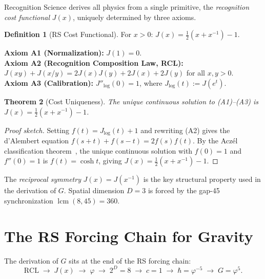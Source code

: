 \documentclass[12pt,a4paper]{article}
\newtheorem{theorem}{Theorem}[section]
\theoremstyle{definition}
\newtheorem{definition}[theorem]{Definition}
\theoremstyle{remark}
\begin{document}
Recognition Science derives all physics from a single primitive,
the \emph{recognition cost functional} $J(x)$, uniquely determined
by three axioms.

\begin{definition}[RS Cost Functional]
For $x > 0$: $J(x) = \tfrac{1}{2}(x + x^{-1}) - 1$.
\end{definition}

\noindent\textbf{Axiom A1 (Normalization):} $J(1) = 0$.\\
\textbf{Axiom A2 (Recognition Composition Law, RCL):}
$J(xy) + J(x/y) = 2J(x)J(y) + 2J(x) + 2J(y)$ for all $x, y > 0$.\\
\textbf{Axiom A3 (Calibration):} $J''_{\log}(0) = 1$, where
$J_{\log}(t) := J(e^t)$.

\begin{theorem}[Cost Uniqueness]
\label{thm:unique}
The unique continuous solution to \textup{(A1)--(A3)} is
$J(x) = \tfrac{1}{2}(x + x^{-1}) - 1$.
\end{theorem}

\begin{proof}[Proof sketch]
Setting $f(t) = J_{\log}(t) + 1$ and rewriting \textup{(A2)} gives the
d'Alembert equation $f(s+t) + f(s-t) = 2f(s)f(t)$.  By the Acz\'el
classification theorem~\cite{Aczel1966}, the unique continuous solution
with $f(0) = 1$ and $f''(0) = 1$ is $f(t) = \cosh t$, giving
$J(x) = \tfrac{1}{2}(x + x^{-1}) - 1$.
\end{proof}

\noindent The \emph{reciprocal symmetry} $J(x) = J(x^{-1})$ is the key
structural property used in the derivation of $G$.  Spatial dimension
$D = 3$ is forced by the gap-45 synchronization $\operatorname{lcm}(8,45) = 360$.

\section{The RS Forcing Chain for Gravity}
\label{sec:chain}

The derivation of $G$ sits at the end of the RS forcing chain:
\begin{equation}
  \mathrm{RCL} \;\to\; J(x) \;\to\; \varphi \;\to\;
  2^D = 8 \;\to\; c = 1 \;\to\;
  \hbar = \varphi^{-5} \;\to\;
  \boxed{G = \varphi^5.}
\end{equation}
\end{document}
